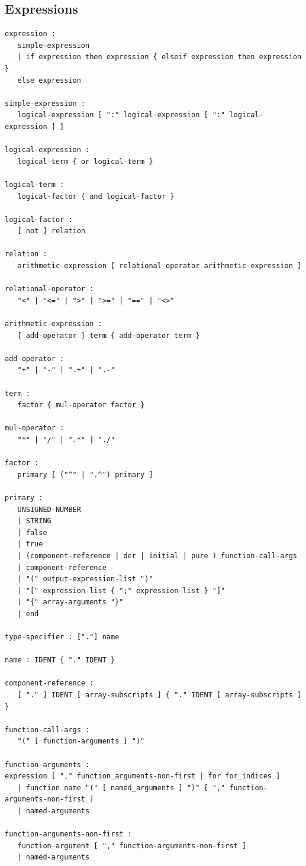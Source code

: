 \documentclass[10pt,a4paper]{report}
\def\doublelabel#1{\label{#1}}
\begin{document}
\subsection{Expressions}\doublelabel{expressions1}
\begin{lstlisting}[language=grammar]
expression :
   simple-expression
   | if expression then expression { elseif expression then expression }
   else expression
   
simple-expression :
   logical-expression [ ":" logical-expression [ ":" logical-expression ] ]
   
logical-expression :
   logical-term { or logical-term }
   
logical-term :
   logical-factor { and logical-factor }

logical-factor :
   [ not ] relation
   
relation :
   arithmetic-expression [ relational-operator arithmetic-expression ]

relational-operator :
   "<" | "<=" | ">" | ">=" | "==" | "<>"

arithmetic-expression :
   [ add-operator ] term { add-operator term }

add-operator :
   "+" | "-" | ".+" | ".-"

term :
   factor { mul-operator factor }

mul-operator :
   "*" | "/" | ".*" | "./"

factor :
   primary [ ("^" | ".^") primary ]

primary :
   UNSIGNED-NUMBER
   | STRING
   | false
   | true
   | (component-reference | der | initial | pure ) function-call-args
   | component-reference
   | "(" output-expression-list ")"
   | "[" expression-list { ";" expression-list } "]"
   | "{" array-arguments "}"
   | end
   
type-specifier : ["."] name

name : IDENT { "." IDENT }

component-reference :
   [ "." ] IDENT [ array-subscripts ] { "." IDENT [ array-subscripts ] }

function-call-args :
   "(" [ function-arguments ] ")"

function-arguments :
expression [ "," function_arguments-non-first | for for_indices ]
   | function name "(" [ named_arguments ] ")" [ "," function-arguments-non-first ]
   | named-arguments

function-arguments-non-first :
   function-argument [ "," function-arguments-non-first ]
   | named-arguments


\end{lstlisting}
\end{document}
